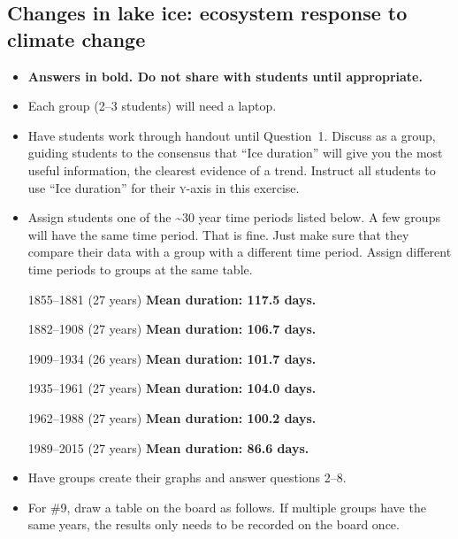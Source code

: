 \documentclass[12pt]{exam}
\newcommand{\hidepoints}{%
	\pointsinmargin\pointformat{}
}
\begin{document}
\hidepoints

\subsection*{Changes in lake ice: ecosystem response to climate change}

\begin{itemize}
	\item \textbf{Answers in bold. Do not share with students until appropriate.}
\item
  Each group (2–3 students) will need a laptop.
\item
  Have students work through handout until Question~1. Discuss as a
  group, guiding students to the consensus that ``Ice duration'' will give you the
  most useful information, the clearest evidence of a trend. Instruct all
  students to use ``Ice duration'' for their \textsc{y}-axis in this exercise.
    
\item
  Assign students one of the \textasciitilde{}30 year time periods listed below. 
  A few groups will have the same time period. That is
  fine. Just make sure that they compare their data with a group with a
  different time period. Assign different time periods to groups at the same table. 

  1855–1881 (27 years) \quad \ifprintanswers \textbf{Mean duration: 117.5 days.}\fi
  
  1882–1908 (27 years) \quad \ifprintanswers \textbf{Mean duration: 106.7 days.}\fi
  
  1909–1934 (26 years) \quad \ifprintanswers \textbf{Mean duration: 101.7 days.}\fi
  
  1935–1961 (27 years) \quad \ifprintanswers \textbf{Mean duration: 104.0 days.}\fi
  
  1962–1988 (27 years) \quad \ifprintanswers \textbf{Mean duration: 100.2 days.}\fi
  
  1989–2015 (27 years) \quad \ifprintanswers \textbf{Mean duration: 86.6 days.}\fi
  
\item
  Have groups create their graphs and answer questions 2–8.
  
\item
  For \#9, draw a table on the board as follows. If multiple
  groups have the same years, the results only needs to be recorded on the board once. 
  
\end{itemize}
\end{document}
